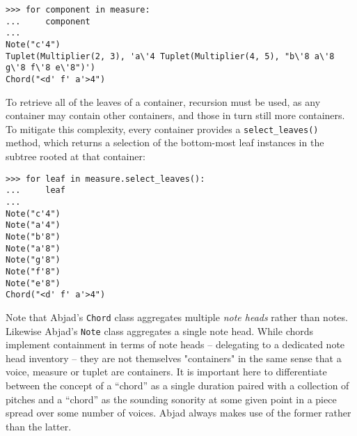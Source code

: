 \begin{abjadbookoutput}
\begin{singlespacing}
\vspace{-0.5\baselineskip}
\begin{lstlisting}
>>> for component in measure:
...     component
...
Note("c'4")
Tuplet(Multiplier(2, 3), 'a\'4 Tuplet(Multiplier(4, 5), "b\'8 a\'8 g\'8 f\'8 e\'8")')
Chord("<d' f' a'>4")
\end{lstlisting}
\end{singlespacing}
\end{abjadbookoutput}

\noindent To retrieve all of the leaves of a container, recursion must be used,
as any container may contain other containers, and those in turn still more
containers. To mitigate this complexity, every container provides a
\texttt{select\_leaves()} method, which returns a selection of the bottom-most
leaf instances in the subtree rooted at that container:

\begin{comment}
<abjad>
for leaf in measure.select_leaves():
    leaf

</abjad>
\end{comment}

\begin{abjadbookoutput}
\begin{singlespacing}
\vspace{-0.5\baselineskip}
\begin{lstlisting}
>>> for leaf in measure.select_leaves():
...     leaf
...
Note("c'4")
Note("a'4")
Note("b'8")
Note("a'8")
Note("g'8")
Note("f'8")
Note("e'8")
Chord("<d' f' a'>4")
\end{lstlisting}
\end{singlespacing}
\end{abjadbookoutput}

Note that Abjad's \texttt{Chord} class aggregates multiple \emph{note heads}
rather than notes. Likewise Abjad's \texttt{Note} class aggregates a single
note head. While chords implement containment in terms of note heads --
delegating to a dedicated note head inventory -- they are not themselves
"containers" in the same sense that a voice, measure or tuplet are containers.
It is important here to differentiate between the concept of a \enquote{chord}
as a single duration paired with a collection of pitches and a \enquote{chord}
as the sounding sonority at some given point in a piece spread over some number
of voices. Abjad always makes use of the former rather than the latter.

